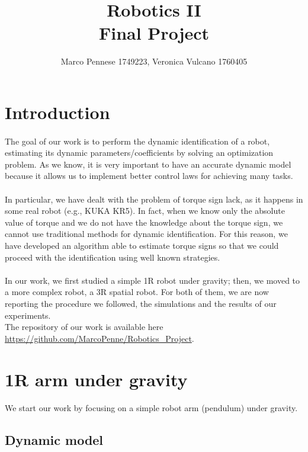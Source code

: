 \documentclass{article}
\title{\textbf{Robotics II} \\ \large{\textbf{Final Project}}}
\author{Marco Pennese 1749223, Veronica Vulcano 1760405}
\date{}
\begin{document}
\maketitle
\tableofcontents
\pagebreak

\section{Introduction}
\paragraph{}The goal of our work is to perform the dynamic identification of a robot, estimating its dynamic parameters/coefficients by solving an optimization problem. As we know, it is very important to have an accurate dynamic model because it allows us to implement better control laws for achieving many tasks.
\paragraph{}In particular, we have dealt with the problem of torque sign lack, as it happens in some real robot (e.g., KUKA KR5). In fact, when we know only the absolute value of torque and we do not have the knowledge about the torque sign, we cannot use traditional methods for dynamic identification. For this reason, we have developed an algorithm able to estimate torque signs so that we could proceed with the identification using well known strategies.
\paragraph{}In our work, we first studied a simple 1R robot under gravity; then, we moved to a more complex robot, a 3R spatial robot. For both of them, we are now reporting the procedure we followed, the simulations and the results of our experiments.\\

The repository of our work is available here \url{https://github.com/MarcoPenne/Robotics_Project}.

\section{1R arm under gravity}
\paragraph{}We start our work by focusing on a simple robot arm (pendulum) under gravity.
\subsection{Dynamic model}
\end{document}
